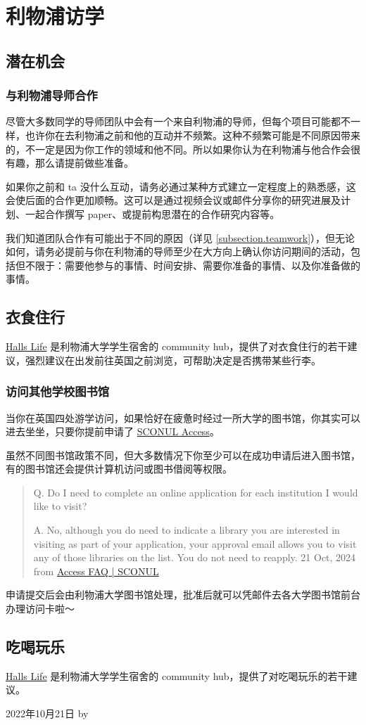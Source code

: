 \section{利物浦访学}
\label{section.UoL_visit}

\subsection{潜在机会}
\subsubsection{与利物浦导师合作}
尽管大多数同学的导师团队中会有一个来自利物浦的导师，但每个项目可能都不一样，也许你在去利物浦之前和他的互动并不频繁。这种不频繁可能是不同原因带来的，不一定是因为你工作的领域和他不同。所以如果你认为在利物浦与他合作会很有趣，那么请提前做些准备。

如果你之前和 ta 没什么互动，请务必通过某种方式建立一定程度上的熟悉感，这会使后面的合作更加顺畅。这可以是通过视频会议或邮件分享你的研究进展及计划、一起合作撰写 paper、或提前构思潜在的合作研究内容等。

我们知道团队合作有可能出于不同的原因（详见 \ref{subsection.teamwork}），但无论如何，请务必提前与你在利物浦的导师至少在大方向上确认你访问期间的活动，包括但不限于：需要他参与的事情、时间安排、需要你准备的事情、以及你准备做的事情。


\subsection{衣食住行}
\href{https://hallslife.liverpool.ac.uk}{Halls Life} 是利物浦大学学生宿舍的 community hub，提供了对衣食住行的若干建议，强烈建议在出发前往英国之前浏览，可帮助决定是否携带某些行李。

\subsubsection{访问其他学校图书馆}
当你在英国四处游学访问，如果恰好在疲惫时经过一所大学的图书馆，你其实可以进去坐坐，只要你提前申请了 \href{https://access.sconul.ac.uk/sconul-access}{SCONUL Access}。

虽然不同图书馆政策不同，但大多数情况下你至少可以在成功申请后进入图书馆，有的图书馆还会提供计算机访问或图书借阅等权限。

\begin{quote}
    Q. Do I need to complete an online application for each institution I would like to visit?
    
    A. No, although you do need to indicate a library you are interested in visiting as part of your application, your approval email allows you to visit any of those libraries on the list. You do not need to reapply. \hfill 21 Oct, 2024 from \href{https://access.sconul.ac.uk/page/access-faq#Multiple%20applications}{Access FAQ | SCONUL}
\end{quote}

申请提交后会由利物浦大学图书馆处理，批准后就可以凭邮件去各大学图书馆前台办理访问卡啦～


\subsection{吃喝玩乐}
\href{https://hallslife.liverpool.ac.uk}{Halls Life} 是利物浦大学学生宿舍的 community hub，提供了对吃喝玩乐的若干建议。

\begin{flushright}
    2022年10月21日 by \Shiyao
\end{flushright}